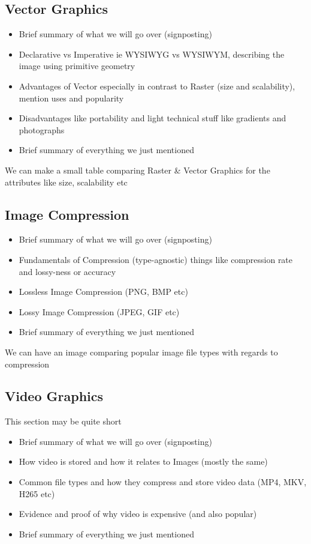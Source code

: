 \documentclass[14pt]{article}
\begin{document}
    \subsection{Vector Graphics}

    \begin{itemize}
        \item Brief summary of what we will go over (signposting)
        \item Declarative vs Imperative ie WYSIWYG vs WYSIWYM, describing the image using primitive geometry
        \item Advantages of Vector especially in contrast to Raster (size and scalability), mention uses and popularity
        \item Disadvantages like portability and light technical stuff like gradients and photographs
        \item Brief summary of everything we just mentioned
    \end{itemize}

    We can make a small table comparing Raster \& Vector Graphics for the attributes like size, scalability etc

    \subsection{Image Compression}

    \begin{itemize}
        \item Brief summary of what we will go over (signposting)
        \item Fundamentals of Compression (type-agnostic) things like compression rate and lossy-ness or accuracy
        \item Lossless Image Compression (PNG, BMP etc)
        \item Lossy Image Compression (JPEG, GIF etc)
        \item Brief summary of everything we just mentioned
    \end{itemize}

    We can have an image comparing popular image file types with regards to compression

    \subsection{Video Graphics}

    This section may be quite short

    \begin{itemize}
        \item Brief summary of what we will go over (signposting)
        \item How video is stored and how it relates to Images (mostly the same)
        \item Common file types and how they compress and store video data (MP4, MKV, H265 etc)
        \item Evidence and proof of why video is expensive (and also popular)
        \item Brief summary of everything we just mentioned
    \end{itemize}
\end{document}
